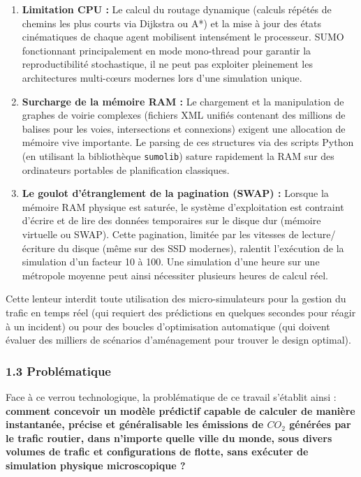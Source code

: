 \documentclass[10pt, a4paper]{article}
\providecommand{\tightlist}{}
\begin{document}
\begin{enumerate}
\def\labelenumi{\arabic{enumi}.}
\tightlist
\item
  \textbf{Limitation CPU :} Le calcul du routage dynamique (calculs
  répétés de chemins les plus courts via Dijkstra ou A*) et la mise à
  jour des états cinématiques de chaque agent mobilisent intensément le
  processeur. SUMO fonctionnant principalement en mode mono-thread pour
  garantir la reproductibilité stochastique, il ne peut pas exploiter
  pleinement les architectures multi-cœurs modernes lors d'une
  simulation unique.
\item
  \textbf{Surcharge de la mémoire RAM :} Le chargement et la
  manipulation de graphes de voirie complexes (fichiers XML unifiés
  contenant des millions de balises pour les voies, intersections et
  connexions) exigent une allocation de mémoire vive importante. Le
  parsing de ces structures via des scripts Python (en utilisant la
  bibliothèque \texttt{sumolib}) sature rapidement la RAM sur des
  ordinateurs portables de planification classiques.
\item
  \textbf{Le goulot d'étranglement de la pagination (SWAP) :} Lorsque la
  mémoire RAM physique est saturée, le système d'exploitation est
  contraint d'écrire et de lire des données temporaires sur le disque
  dur (mémoire virtuelle ou SWAP). Cette pagination, limitée par les
  vitesses de lecture/écriture du disque (même sur des SSD modernes),
  ralentit l'exécution de la simulation d'un facteur 10 à 100. Une
  simulation d'une heure sur une métropole moyenne peut ainsi nécessiter
  plusieurs heures de calcul réel.
\end{enumerate}

Cette lenteur interdit toute utilisation des micro-simulateurs pour la
gestion du trafic en temps réel (qui requiert des prédictions en
quelques secondes pour réagir à un incident) ou pour des boucles
d'optimisation automatique (qui doivent évaluer des milliers de
scénarios d'aménagement pour trouver le design optimal).

\subsubsection{1.3 Problématique}\label{probluxe9matique}

Face à ce verrou technologique, la problématique de ce travail s'établit
ainsi : \textbf{comment concevoir un modèle prédictif capable de
calculer de manière instantanée, précise et généralisable les émissions
de \(CO_2\) générées par le trafic routier, dans n'importe quelle ville
du monde, sous divers volumes de trafic et configurations de flotte,
sans exécuter de simulation physique microscopique ?}
\end{document}
